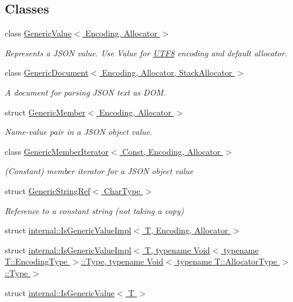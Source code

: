 \subsection*{Classes}
\begin{DoxyCompactItemize}
\item 
class \hyperlink{a00130}{Generic\+Value$<$ Encoding, Allocator $>$}
\begin{DoxyCompactList}\small\item\em Represents a J\+S\+ON value. Use Value for \hyperlink{a00333}{U\+T\+F8} encoding and default allocator. \end{DoxyCompactList}\item 
class \hyperlink{a00115}{Generic\+Document$<$ Encoding, Allocator, Stack\+Allocator $>$}
\begin{DoxyCompactList}\small\item\em A document for parsing J\+S\+ON text as D\+OM. \end{DoxyCompactList}\item 
struct \hyperlink{a00117}{Generic\+Member$<$ Encoding, Allocator $>$}
\begin{DoxyCompactList}\small\item\em Name-\/value pair in a J\+S\+ON object value. \end{DoxyCompactList}\item 
class \hyperlink{a00118}{Generic\+Member\+Iterator$<$ Const, Encoding, Allocator $>$}
\begin{DoxyCompactList}\small\item\em (Constant) member iterator for a J\+S\+ON object value \end{DoxyCompactList}\item 
struct \hyperlink{a00128}{Generic\+String\+Ref$<$ Char\+Type $>$}
\begin{DoxyCompactList}\small\item\em Reference to a constant string (not taking a copy) \end{DoxyCompactList}\item 
struct \hyperlink{a00185}{internal\+::\+Is\+Generic\+Value\+Impl$<$ T, Encoding, Allocator $>$}
\item 
struct \hyperlink{a00186}{internal\+::\+Is\+Generic\+Value\+Impl$<$ T, typename Void$<$ typename T\+::\+Encoding\+Type $>$\+::\+Type, typename Void$<$ typename T\+::\+Allocator\+Type $>$\+::\+Type $>$}
\item 
struct \hyperlink{a00184}{internal\+::\+Is\+Generic\+Value$<$ T $>$}
\item 

\end{DoxyCompactItemize}
